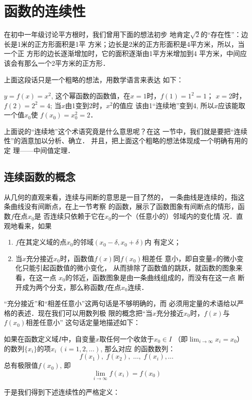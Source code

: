 \section{函数的连续性}
在初中一年级讨论平方根时，我们曾用下面的想法初步
地肯定$\sqrt{2}$的“存在性”：边长是1米的正方形面积是1平
方米；边长是2米的正方形面积是4平方米，所以，当一个正
方形的边长逐渐增加时，它的面积逐渐由1平方米增加到4
平方米，中间应该会有那么一个2平方米的正方形．

上面这段话只是一个粗略的想法，用数学语言来表达
如下：

$y=f(x)=x^2$, 这个幂函数的函数值，在$x=1$时，$f(1)=1^2=1$；
$x=2$时，$f(2)=2^2=4$; 当$x$由1变到2时，$x^2$的值应
该由1“连续地”变到4, 所以$x$应该能取一个值$x_0$使
$f(x_0)=x^2_0=2$．

上面说的“连续地”这个术语究竟是什么意思呢？在这
一节中，我们就是要把“连续性”的涵意加以分析、确立．
并且，把上面这个粗略的想法体现成一个明确有用的定
理——中间值定理．

\subsection{连续函数的概念}
从几何的直观来看，连续与间断的意思是一目了然的，
一条曲线是连续的，指这条曲线没有间断点，在上一节考察
的函数，展示了函数图象有间断点的情形，函数$f$在点$x_0$是
否连续只依赖于它在$x_0$的一个（任意小的）邻域内的变化情
况．直观地看来，如果
\begin{enumerate}
\item $f$在其定义域的点$x_0$的邻域$(x_0-\delta,x_0+\delta)$内
有定义；
\item 当$x$充分接近$x_0$时，函数值$f(x)$同$f(x_0)$相差任
意小，即自变量$x$的微小变化只能引起函数值的微小变化，
从而排除了函数值的跳跃，就函数的图象来看，在这一点
$x_0$的邻近，函数图象是由一条曲线组成的，而没有在这一点
断开成为两个分支，那么称函数$f$在点$x_0$连续．
\end{enumerate}


“充分接近”和“相差任意小”这两句话是不够明确的，而
必须用定量的术语给以严格的表述．现在我们可以用数列极
限的概念把“当$x$充分接近$x_0$时，$f(x)$与$f(x_0)$相差任意小”
这句话定量地描述如下：

如果在函数定义域$I$中，自变量$x$取任何一个收敛于$x_0\in I$
（即$\displaystyle\lim_{i\to\infty}x_i=x_0$）的数列$\{x_i\}$的项$x_i\; (i=1,2,\ldots)$, 那么对应
的函数数列：
\[f(x_1),\; f(x_2),\; \ldots,\;  f(x_i),\ldots\]
总有极限值$f(x_0)$, 即
\[\lim_{i\to\infty} f(x_i)=f(x_0)\]

于是我们得到下述连续性的严格定义：

